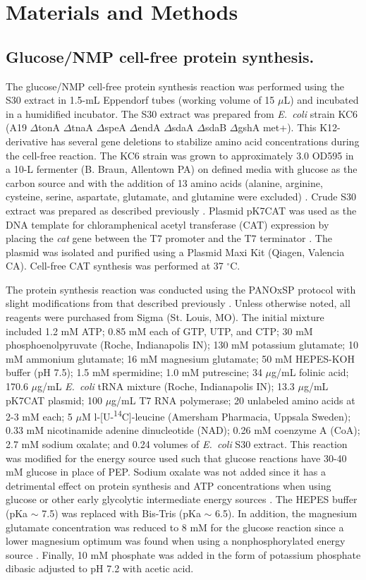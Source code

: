 \documentclass[journal=asbcd6,manuscript=article]{achemso}
\begin{document}
\section*{Materials and Methods}

\subsection*{Glucose/NMP cell-free protein synthesis.}
The glucose/NMP cell-free protein synthesis reaction was
performed using the S30 extract in 1.5-mL Eppendorf tubes (working volume of 15 $\mu$L) and incubated in a humidified incubator.
The S30 extract was prepared from \textit{E.~coli} strain KC6 (A19 $\Delta$tonA $\Delta$tnaA $\Delta$speA $\Delta$endA $\Delta$sdaA $\Delta$sdaB $\Delta$gshA met+).
This K12-derivative has several gene deletions to stabilize amino acid concentrations during the cell-free reaction.
The KC6 strain was grown to approximately 3.0 OD595 in a 10-L fermenter (B. Braun, Allentown PA) on defined media with glucose as the carbon source and with the addition of 13 amino acids (alanine, arginine, cysteine, serine, aspartate, glutamate, and glutamine were excluded) \cite{Zawada:2003}. Crude S30 extract was prepared as described previously \cite{Jewett:2002}.
Plasmid pK7CAT was used as the DNA template for chloramphenical acetyl transferase (CAT) expression by placing the \emph{cat} gene
between the T7 promoter and the T7 terminator \cite{Kigawa1995}.
The plasmid was isolated and purified using a Plasmid Maxi Kit (Qiagen, Valencia CA).
Cell-free CAT synthesis was performed at 37 $^{\circ}$C.

The protein synthesis reaction was conducted using the PANOxSP protocol with slight modifications from that described previously \cite{BIT:BIT20026}.
Unless otherwise noted, all reagents were purchased from Sigma (St. Louis, MO).
The initial mixture included 1.2 mM ATP; 0.85 mM each of GTP, UTP, and CTP; 30 mM phosphoenolpyruvate (Roche, Indianapolis IN); 130 mM potassium glutamate; 10 mM ammonium glutamate; 16 mM magnesium glutamate; 50 mM HEPES-KOH buffer (pH 7.5); 1.5 mM spermidine; 1.0 mM putrescine; 34 $\mu$g/mL folinic acid; 170.6 $\mu$g/mL \textit{E.~coli} tRNA mixture (Roche, Indianapolis IN); 13.3 $\mu$g/mL pK7CAT plasmid; 100 $\mu$g/mL T7 RNA polymerase; 20 unlabeled amino acids at 2-3 mM each; 5 $\mu$M l-[U-\textsuperscript{14}C]-leucine (Amersham Pharmacia, Uppsala Sweden); 0.33 mM nicotinamide adenine dinucleotide (NAD); 0.26 mM coenzyme A (CoA); 2.7 mM sodium oxalate; and 0.24 volumes of \textit{E.~coli} S30 extract.
This reaction was modified for the energy source used such that glucose reactions have 30-40 mM glucose in place of PEP.
Sodium oxalate was not added since it has a detrimental effect on protein synthesis and ATP concentrations when using glucose or other early glycolytic intermediate energy sources \cite{BIT:BIT1121}. The HEPES buffer (pKa $\sim$ 7.5) was replaced with Bis-Tris (pKa $\sim$ 6.5). In addition, the magnesium glutamate concentration was reduced to 8 mM for the glucose reaction since a lower magnesium optimum was found when using a nonphosphorylated energy source \cite{BIT:BIT20026}. Finally, 10 mM phosphate was added in the form of potassium phosphate dibasic adjusted to pH 7.2 with acetic acid.
\end{document}
